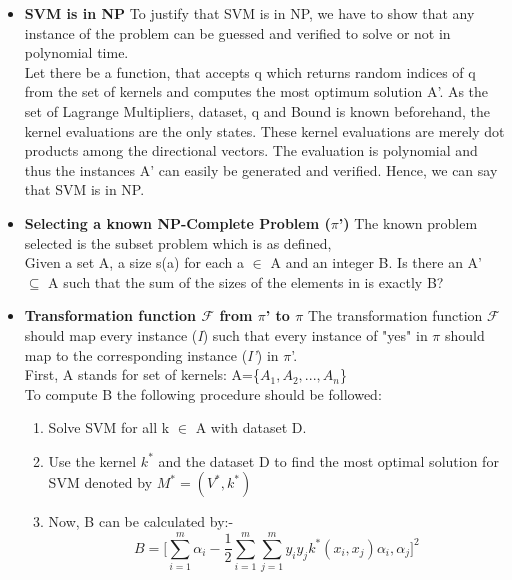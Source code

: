 \documentclass[12pt,a4paper,final]{report}
\begin{document}
{{{{\begin{itemize}
Where, we have to find a subset A' $\subseteq$ A of size q to minimize the cost. The cost function is used for reaching a bound B using set of Kernels, dataset and the Support Vectors.\\
\item
\textbf{SVM is in NP}
\newline To justify that SVM is in NP, we have to show that any instance of the problem can be guessed and verified to solve or not in polynomial time.\\
Let there be a function, that accepts q which returns random indices of q from the set of kernels and computes the most optimum solution A'. As the set of Lagrange Multipliers, dataset, q and Bound is known beforehand, the kernel evaluations are the only states.  These kernel evaluations are merely dot products among the directional vectors. The evaluation is polynomial and thus the instances A' can easily be generated and verified. Hence, we can say that SVM is in NP.
\item
\textbf{Selecting a known NP-Complete Problem ($\pi$')}
\newline The known problem selected is the subset problem which is as defined,\\
Given a set A, a size s(a) for each a $\in$ A and an integer B. Is there an A' $\subseteq$ A such that the sum of the sizes of the elements in is exactly B?\\
\item
\textbf{Transformation function $\mathcal{F}$ from $\pi$' to $\pi$}
\newline The transformation function $\mathcal{F}$ should map every instance (\emph{I}) such that every instance of "yes" in $\pi$ should map to the corresponding instance (\emph{I'}) in $\pi$'.\\
First, A stands for set of kernels: A=\{$A_1,A_2,...,A_n$\} \\
To compute B the following procedure should be followed: \\
\begin{enumerate}
\item
Solve SVM for all k $\in$ A with dataset D.
\item
Use the kernel $k^*$ and the dataset D to find the most optimal solution for SVM denoted by $M^* = (V^*,k^*)$
\item 
Now, B can be calculated by:- 
\begin{equation}
B = \Big[\sum_{i=1}^{m} \alpha_i - \frac{1}{2}\sum_{i=1}^{m}\sum_{j=1}^{m}y_iy_jk^*(x_i,x_j)\alpha_i,\alpha_j\Big]^2

\end{equation}
\end{enumerate}
\end{itemize}}}}}
\end{document}
